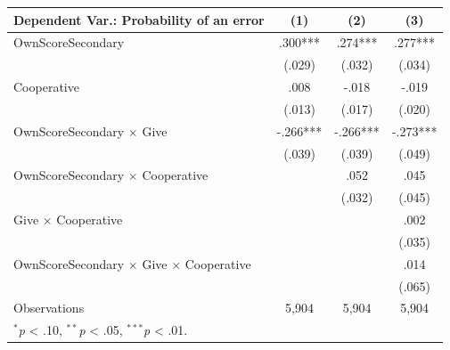 \begingroup
\centering
\begin{tabular*}{\linewidth}{@{\extracolsep{\fill}}lccc}
   \toprule
   Dependent Var.: Probability of an error & \multicolumn{1}{c}{(1)} & \multicolumn{1}{c}{(2)} & \multicolumn{1}{c}{(3)}\\
   \midrule
   OwnScoreSecondary & \mbox{\hphantom{8}.300***} & \mbox{\hphantom{8}.274***} & \mbox{\hphantom{8}.277***}\\
    & \mbox{(.029)\hphantom{88}} & \mbox{(.032)\hphantom{88}} & \mbox{(.034)\hphantom{88}}\\
   Cooperative & \mbox{\hphantom{8}.008\hphantom{888}} & \mbox{-.018\hphantom{888}} & \mbox{-.019\hphantom{888}}\\
    & \mbox{(.013)\hphantom{88}} & \mbox{(.017)\hphantom{88}} & \mbox{(.020)\hphantom{88}}\\
   OwnScoreSecondary $\times$ Give & \mbox{-.266***} & \mbox{-.266***} & \mbox{-.273***}\\
    & \mbox{(.039)\hphantom{88}} & \mbox{(.039)\hphantom{88}} & \mbox{(.049)\hphantom{88}}\\
   OwnScoreSecondary $\times$ Cooperative &  & \mbox{\hphantom{8}.052\hphantom{888}} & \mbox{\hphantom{8}.045\hphantom{888}}\\
    &  & \mbox{(.032)\hphantom{88}} & \mbox{(.045)\hphantom{88}}\\
   Give $\times$ Cooperative &  &  & \mbox{\hphantom{8}.002\hphantom{888}}\\
    &  &  & \mbox{(.035)\hphantom{88}}\\
   OwnScoreSecondary $\times$ Give $\times$ Cooperative &  &  & \mbox{\hphantom{8}.014\hphantom{888}}\\
    &  &  & \mbox{(.065)\hphantom{88}}\\
   \midrule
   Observations & 5,904 & 5,904 & 5,904\\
   \multicolumn{4}{l}{\footnotesize $^{*}$\textit{p} < .10, $^{**}$\textit{p} < .05, $^{***}$\textit{p} < .01.}\\
   \bottomrule
\end{tabular*}
\par\endgroup
